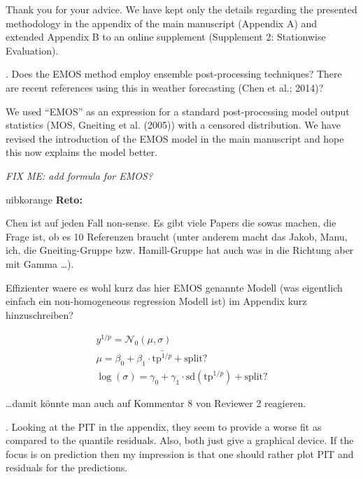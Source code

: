 \documentclass[american,foldmarks=false,noconfig]{uibklttr}
\newenvironment{review}{\fontshape{\itdefault}\fontseries{\bfdefault} \selectfont \smallskip}{\par}
\newenvironment{reto}{
    \begin{color}{uibkorange}
    \textbf{Reto:~}
        \itshape
}{
    \end{color}
}
\begin{document}
Thank you for your advice. We have kept only the details regarding
the presented methodology in the appendix of the main manuscript
(Appendix A) and extended Appendix B to an online supplement
(Supplement 2: Stationwise Evaluation).

\begin{review}
2. Does the EMOS method employ ensemble post-processing 
techniques? There are recent references using this in weather 
forecasting (Chen et al.; 2014)?
\end{review}

We used ``EMOS'' as an expression for a standard post-processing
model output statistics (MOS, Gneiting et al. (2005)) with a censored 
distribution. We have revised the introduction of the EMOS model in 
the main manuscript and hope this now explains the model better.

\textit{FIX ME: add formula for EMOS?}

\begin{reto}
Chen ist auf jeden Fall non-sense. Es gibt viele Papers die
sowas machen, die Frage ist, ob es 10 Referenzen braucht (unter
anderem macht das Jakob, Manu, ich, die Gneiting-Gruppe bzw.
Hamill-Gruppe hat auch was in die Richtung aber mit Gamma \dots).

Effizienter waere es wohl kurz das hier EMOS genannte Modell (was
eigentlich einfach ein non-homogeneous regression Modell ist)
im Appendix kurz hinzuschreiben?

    \begin{equation}
        \begin{split}
            y^{1/p} = \mathcal{N}_0(\mu, \sigma) \\
            \mu = \beta_0 + \beta_1 \cdot \bar{\mbox{tp}^{1/p}} + \mbox{split?} \\
            \log(\sigma) = \gamma_0 + \gamma_1 \cdot \mbox{sd}(\mbox{tp}^{1/p}) + \mbox{split?}
        \end{split}
    \end{equation}

\dots damit k\"onnte man auch auf Kommentar 8 von Reviewer 2 reagieren.
\end{reto}

\begin{review}
3. Looking at the PIT in the appendix, they seem to provide a 
worse fit as compared to the quantile residuals. Also, both 
just give a graphical device. If the focus is on prediction 
then my impression is that one should rather plot PIT and 
residuals for the predictions.
\end{review}
\end{document}
